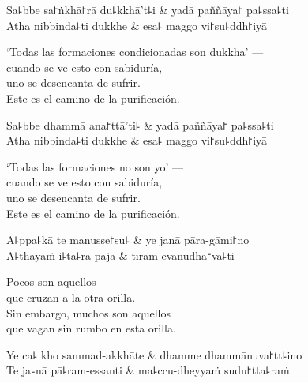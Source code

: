\begin{twochants}
  Sa꜕bbe sa꜓ṅkhā꜓rā du꜕kkhā't꜕i & yadā paññāya꜓ pa꜕ssa꜕ti \\
  Atha nibbinda꜕ti dukkhe & esa꜕ maggo vi꜓su꜕ddh꜓iyā \\
\end{twochants}

\begin{english}
  ‘Todas las formaciones condicionadas son dukkha’ ---\\
  cuando se ve esto con sabiduría,\\
  uno se desencanta de sufrir.\\
  Este es el camino de la purificación.
\end{english}

\begin{twochants}
  Sa꜕bbe dhammā ana꜓ttā'ti꜕ & yadā paññāya꜓ pa꜕ssa꜕ti \\
  Atha nibbinda꜕ti dukkhe & esa꜕ maggo vi꜓su꜕ddh꜓iyā \\
\end{twochants}

\begin{english}
  ‘Todas las formaciones no son yo’ ---\\
  cuando se ve esto con sabiduría,\\
  uno se desencanta de sufrir.\\
  Este es el camino de la purificación.
\end{english}

\clearpage

\begin{twochants}
  A꜕ppa꜕kā te manusse꜓su꜕ & ye janā pāra-gāmi꜓no \\
  A꜕thāyaṁ i꜕ta꜕rā pajā & tīram-evānudhā꜓va꜕ti \\
\end{twochants}

\begin{english}
  Pocos son aquellos\\
  que cruzan a la otra orilla.\\
  Sin embargo, muchos son aquellos\\
  que vagan sin rumbo en esta orilla.
\end{english}

\begin{twochants}
  Ye ca꜕ kho sammad-akkhāte & dhamme dhammānuva꜓tt꜕ino \\
  Te ja꜕nā pā꜕ram-essanti & ma꜕ccu-dheyyaṁ sudu꜓tta꜕raṁ \\
\end{twochants}


